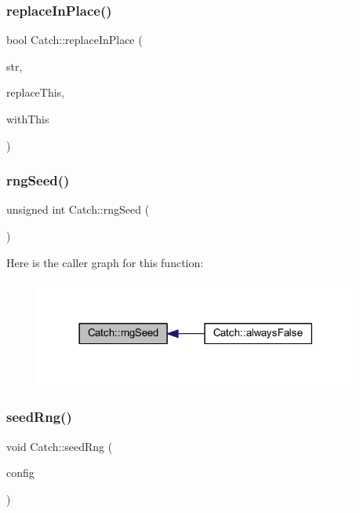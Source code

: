 \subsubsection{\texorpdfstring{replace\+In\+Place()}{replaceInPlace()}}
{\footnotesize\ttfamily bool Catch\+::replace\+In\+Place (\begin{DoxyParamCaption}\item[{std\+::string \&}]{str,  }\item[{std\+::string const \&}]{replace\+This,  }\item[{std\+::string const \&}]{with\+This }\end{DoxyParamCaption})}

\hypertarget{namespace_catch_acf5ea05e942d2d7fe79111e12754ed76}{}\label{namespace_catch_acf5ea05e942d2d7fe79111e12754ed76} 
\subsubsection{\texorpdfstring{rng\+Seed()}{rngSeed()}}
{\footnotesize\ttfamily unsigned int Catch\+::rng\+Seed (\begin{DoxyParamCaption}{ }\end{DoxyParamCaption})}

Here is the caller graph for this function\+:\nopagebreak
\begin{figure}[H]
\begin{center}
\leavevmode
\includegraphics[width=302pt]{namespace_catch_acf5ea05e942d2d7fe79111e12754ed76_icgraph}
\end{center}
\end{figure}
\hypertarget{namespace_catch_a161400810eb0995394d6d8d3cae821ad}{}\label{namespace_catch_a161400810eb0995394d6d8d3cae821ad} 
\subsubsection{\texorpdfstring{seed\+Rng()}{seedRng()}}
{\footnotesize\ttfamily void Catch\+::seed\+Rng (\begin{DoxyParamCaption}\item[{I\+Config const \&}]{config }\end{DoxyParamCaption})}

